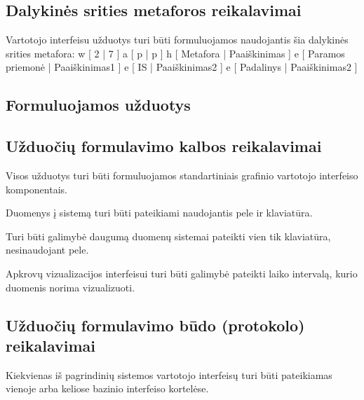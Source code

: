 \subsection{Dalykinės srities metaforos reikalavimai}
{
  Vartotojo interfeisu užduotys turi būti formuluojamos naudojantis šia
  dalykinės srities metafora:
  \xtable
  {
    w [ 2 | 7 ]
    a [ p | p ]
    h [ Metafora | Paaiškinimas ]
    e [ Paramos priemonė | Paaiškinimas1 ]
    e [ IS | Paaiškinimas2 ]
    e [ Padalinys | Paaiškinimas2 ]
  }
}

\subsection{Formuluojamos užduotys}

\subsection{Užduočių formulavimo kalbos reikalavimai}
{Visos užduotys turi būti formuluojamos standartiniais grafinio vartotojo interfeiso 
komponentais.}

{Duomenys į sistemą turi būti pateikiami naudojantis pele ir klaviatūra.}

{Turi būti galimybė daugumą duomenų sistemai pateikti vien tik klaviatūra, nesinaudojant pele.}

{Apkrovų vizualizacijos interfeisui turi būti galimybė pateikti laiko intervalą, kurio duomenis 
  norima vizualizuoti.}

\subsection{Užduočių formulavimo būdo (protokolo) reikalavimai}
{Kiekvienas iš pagrindinių sistemos vartotojo interfeisų turi būti pateikiamas vienoje arba
  keliose bazinio interfeiso kortelėse.}


